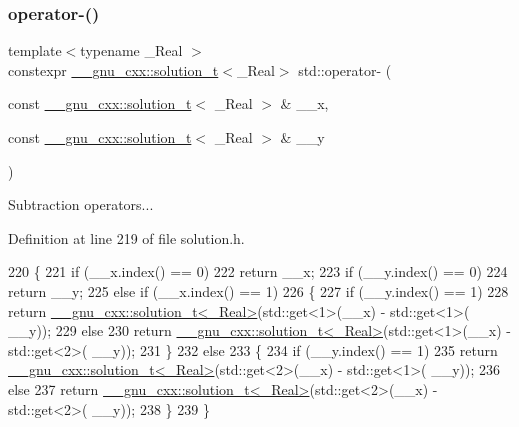 \subsubsection{\texorpdfstring{operator-\/()}{operator-()}\hspace{0.1cm}{\footnotesize\ttfamily [2/6]}}
{\footnotesize\ttfamily template$<$typename \+\_\+\+Real $>$ \\
constexpr \hyperlink{namespace____gnu__cxx_ae20ea642de50eb361074c62676b0159c}{\+\_\+\+\_\+gnu\+\_\+cxx\+::solution\+\_\+t}$<$\+\_\+\+Real$>$ std\+::operator-\/ (\begin{DoxyParamCaption}\item[{const \hyperlink{namespace____gnu__cxx_ae20ea642de50eb361074c62676b0159c}{\+\_\+\+\_\+gnu\+\_\+cxx\+::solution\+\_\+t}$<$ \+\_\+\+Real $>$ \&}]{\+\_\+\+\_\+x,  }\item[{const \hyperlink{namespace____gnu__cxx_ae20ea642de50eb361074c62676b0159c}{\+\_\+\+\_\+gnu\+\_\+cxx\+::solution\+\_\+t}$<$ \+\_\+\+Real $>$ \&}]{\+\_\+\+\_\+y }\end{DoxyParamCaption})}

Subtraction operators... 

Definition at line 219 of file solution.\+h.


\begin{DoxyCode}
220     \{
221       \textcolor{keywordflow}{if} (\_\_x.index() == 0)
222         \textcolor{keywordflow}{return} \_\_x;
223       \textcolor{keywordflow}{if} (\_\_y.index() == 0)
224         \textcolor{keywordflow}{return} \_\_y;
225       \textcolor{keywordflow}{else} \textcolor{keywordflow}{if} (\_\_x.index() == 1)
226         \{
227           \textcolor{keywordflow}{if} (\_\_y.index() == 1)
228             \textcolor{keywordflow}{return} \hyperlink{namespace____gnu__cxx_ae20ea642de50eb361074c62676b0159c}{\_\_gnu\_cxx::solution\_t<\_Real>}(std::get<1>(\_\_x) - std::get<1>(
      \_\_y));
229           \textcolor{keywordflow}{else}
230             \textcolor{keywordflow}{return} \hyperlink{namespace____gnu__cxx_ae20ea642de50eb361074c62676b0159c}{\_\_gnu\_cxx::solution\_t<\_Real>}(std::get<1>(\_\_x) - std::get<2>(
      \_\_y));
231         \}
232       \textcolor{keywordflow}{else}
233         \{
234           \textcolor{keywordflow}{if} (\_\_y.index() == 1)
235             \textcolor{keywordflow}{return} \hyperlink{namespace____gnu__cxx_ae20ea642de50eb361074c62676b0159c}{\_\_gnu\_cxx::solution\_t<\_Real>}(std::get<2>(\_\_x) - std::get<1>(
      \_\_y));
236           \textcolor{keywordflow}{else}
237             \textcolor{keywordflow}{return} \hyperlink{namespace____gnu__cxx_ae20ea642de50eb361074c62676b0159c}{\_\_gnu\_cxx::solution\_t<\_Real>}(std::get<2>(\_\_x) - std::get<2>(
      \_\_y));
238         \}
239     \}
\end{DoxyCode}
\mbox{\label{namespacestd_a35af0b87e94fb38640fa36b7ec161645}} 
